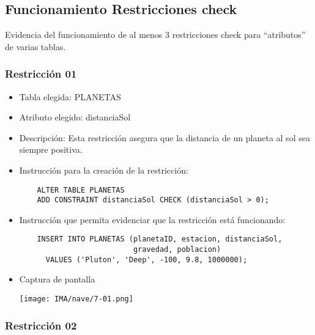 \subsection{Funcionamiento Restricciones check}

Evidencia del funcionamiento de al menos 3 restricciones check para “atributos” de varias
tablas.

\subsubsection*{Restricción 01}

\begin{itemize} 
  \item Tabla elegida: PLANETAS 
  \item Atributo elegido: distanciaSol 
  \item Descripción: Esta restricción asegura que la distancia de un planeta al sol sea siempre positiva. 
  \item Instrucción para la creación de la restricción: 
    \begin{verbatim} 
    ALTER TABLE PLANETAS 
    ADD CONSTRAINT distanciaSol CHECK (distanciaSol > 0); 
    \end{verbatim} 
  \item Instrucción que permita evidenciar que la restricción está funcionando: 
    \begin{verbatim} 
    INSERT INTO PLANETAS (planetaID, estacion, distanciaSol, 
                          gravedad, poblacion) 
      VALUES ('Pluton', 'Deep', -100, 9.8, 1000000);
    \end{verbatim} 
  \item Captura de pantalla 
  \begin{center}
    \texttt{[image: IMA/nave/7-01.png]}
  \end{center} 
\end{itemize}

\subsubsection*{Restricción 02}

